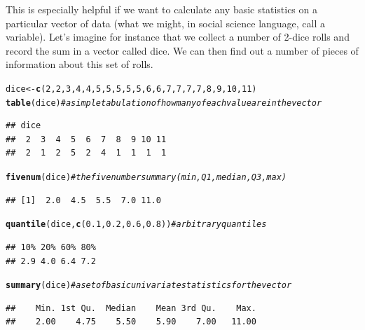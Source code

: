 \documentclass[12pt]{article}\usepackage[]{graphicx}\usepackage[]{color}
\makeatletter
\newcommand{\hlnum}[1]{\textcolor[rgb]{0.686,0.059,0.569}{#1}}%
\newcommand{\hlcom}[1]{\textcolor[rgb]{0.678,0.584,0.686}{\textit{#1}}}%
\newcommand{\hlstd}[1]{\textcolor[rgb]{0.345,0.345,0.345}{#1}}%
\newcommand{\hlkwb}[1]{\textcolor[rgb]{0.69,0.353,0.396}{#1}}%
\newcommand{\hlkwd}[1]{\textcolor[rgb]{0.737,0.353,0.396}{\textbf{#1}}}%
\newenvironment{kframe}{%
 \def\at@end@of@kframe{}%
 \ifinner\ifhmode%
  \def\at@end@of@kframe{\end{minipage}}%
  \begin{minipage}{\columnwidth}%
 \fi\fi%
 \def\FrameCommand##1{\hskip\@totalleftmargin \hskip-\fboxsep
 \colorbox{shadecolor}{##1}\hskip-\fboxsep
     \hskip-\linewidth \hskip-\@totalleftmargin \hskip\columnwidth}%
 \MakeFramed {\advance\hsize-\width
   \@totalleftmargin\z@ \linewidth\hsize
   \@setminipage}}%
 {\par\unskip\endMakeFramed%
 \at@end@of@kframe}
\newenvironment{knitrout}{}{} %
\makeatother
\begin{document}
This is especially helpful if we want to calculate any basic statistics on a particular vector of data (what we might, in social science language, call a variable). Let's imagine for instance that we collect a number of 2-dice rolls and record the sum in a vector called dice. We can then find out a number of pieces of information about this set of rolls.

\begin{knitrout}
\color{fgcolor}\begin{kframe}
\begin{alltt}
\hlstd{dice} \hlkwb{<-} \hlkwd{c}\hlstd{(}\hlnum{2}\hlstd{,}\hlnum{2}\hlstd{,}\hlnum{3}\hlstd{,}\hlnum{4}\hlstd{,}\hlnum{4}\hlstd{,}\hlnum{5}\hlstd{,}\hlnum{5}\hlstd{,}\hlnum{5}\hlstd{,}\hlnum{5}\hlstd{,}\hlnum{5}\hlstd{,}\hlnum{6}\hlstd{,}\hlnum{6}\hlstd{,}\hlnum{7}\hlstd{,}\hlnum{7}\hlstd{,}\hlnum{7}\hlstd{,}\hlnum{7}\hlstd{,}\hlnum{8}\hlstd{,}\hlnum{9}\hlstd{,}\hlnum{10}\hlstd{,}\hlnum{11}\hlstd{)}
\hlkwd{table}\hlstd{(dice)} \hlcom{#a simple tabulation of how many of each value are in the vector}
\end{alltt}
\begin{verbatim}
## dice
##  2  3  4  5  6  7  8  9 10 11 
##  2  1  2  5  2  4  1  1  1  1
\end{verbatim}
\begin{alltt}
\hlkwd{fivenum}\hlstd{(dice)} \hlcom{# the five number summary (min, Q1, median, Q3, max)}
\end{alltt}
\begin{verbatim}
## [1]  2.0  4.5  5.5  7.0 11.0
\end{verbatim}
\begin{alltt}
\hlkwd{quantile}\hlstd{(dice,} \hlkwd{c}\hlstd{(}\hlnum{0.1}\hlstd{,}\hlnum{0.2}\hlstd{,}\hlnum{0.6}\hlstd{,}\hlnum{0.8}\hlstd{))} \hlcom{# arbitrary quantiles}
\end{alltt}
\begin{verbatim}
## 10% 20% 60% 80% 
## 2.9 4.0 6.4 7.2
\end{verbatim}
\begin{alltt}
\hlkwd{summary}\hlstd{(dice)} \hlcom{# a set of basic univariate statistics for the vector}
\end{alltt}
\begin{verbatim}
##    Min. 1st Qu.  Median    Mean 3rd Qu.    Max. 
##    2.00    4.75    5.50    5.90    7.00   11.00
\end{verbatim}
\end{kframe}
\end{knitrout}
\end{document}

